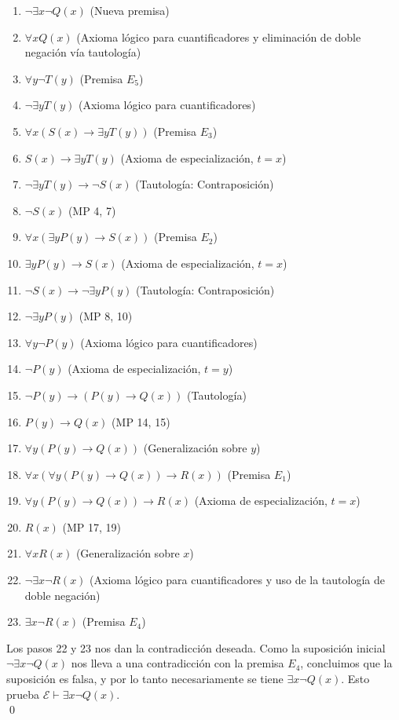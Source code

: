 \begin{enumerate}
   \item $\neg \exists x \neg Q(x)$ \hfill (Nueva premisa)
   \item $\forall x Q(x)$ \quad \hfill (Axioma lógico para cuantificadores y eliminación de doble negación vía tautología)
   \item $\forall y \neg T(y)$ \hfill (Premisa $E_5$)
   \item $\neg \exists y T(y)$ \hfill (Axioma lógico para cuantificadores)
   \item $\forall x ( S(x) \rightarrow \exists y T(y) )$ \hfill (Premisa $E_3$)
   \item $S(x) \rightarrow \exists y T(y)$ \hfill (Axioma de especialización, $t=x$)
   \item $\neg \exists y T(y) \rightarrow \neg S(x)$ \hfill (Tautología: Contraposición)
   \item $\neg S(x)$ \hfill (MP 4, 7)
   \item $\forall x ( \exists y P(y) \rightarrow S(x) )$ \hfill (Premisa $E_2$)
   \item $\exists y P(y) \rightarrow S(x)$ \hfill (Axioma de especialización, $t=x$)
   \item $\neg S(x) \rightarrow \neg \exists y P(y)$ \hfill (Tautología: Contraposición)
   \item $\neg \exists y P(y)$ \hfill (MP 8, 10)
   \item $\forall y \neg P(y)$ \hfill (Axioma lógico para cuantificadores)
   \item $\neg P(y)$ \hfill (Axioma de especialización, $t=y$)
   \item $\neg P(y) \rightarrow ( P(y) \rightarrow Q(x) )$ \hfill (Tautología)
   \item $P(y) \rightarrow Q(x)$ \hfill (MP 14, 15)
   \item $\forall y (P(y) \rightarrow Q(x))$ \hfill (Generalización sobre $y$)
   \item $\forall x ( \forall y ( P(y) \rightarrow Q(x) ) \rightarrow R(x) )$ \hfill (Premisa $E_1$)
   \item $\forall y ( P(y) \rightarrow Q(x) ) \rightarrow R(x)$ \hfill (Axioma de especialización, $t=x$)
   \item $R(x)$ \hfill (MP 17, 19)
   \item $\forall x R(x)$ \hfill (Generalización sobre $x$)
   \item $\neg \exists x \neg R(x)$ \hfill (Axioma lógico para cuantificadores y uso de la tautología de doble negación)
   \item $\exists x \neg R(x)$ \hfill (Premisa $E_4$)
\end{enumerate}
Los pasos 22 y 23 nos dan la contradicción deseada. Como la suposición inicial $\neg \exists x \neg Q(x)$ nos lleva a una contradicción con la premisa $E_4$, concluimos que la suposición es falsa, y por lo tanto necesariamente se tiene $\exists x \neg Q(x)$. Esto prueba $\mathcal{E}\vdash \exists x \neg Q(x)$.\\
\hfill \qed
